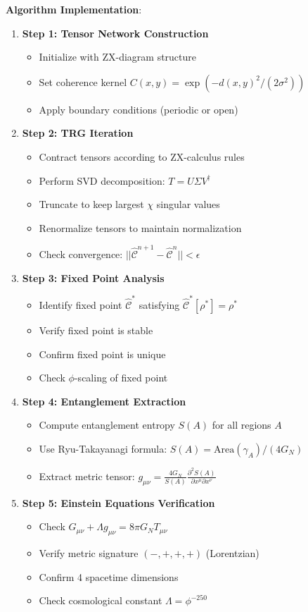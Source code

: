 \documentclass[11pt]{article}
\theoremstyle{definition}
\newcommand{\goldenratio}{\phi}
\newcommand{\coherence}{\mathcal{C}}
\newcommand{\density}{\rho}
\begin{document}
\textbf{Algorithm Implementation}:
\begin{enumerate}
\item \textbf{Step 1: Tensor Network Construction}
\begin{itemize}
\item Initialize with ZX-diagram structure
\item Set coherence kernel $C(x,y) = \exp(-d(x,y)^2/(2\sigma^2))$
\item Apply boundary conditions (periodic or open)
\end{itemize}

\item \textbf{Step 2: TRG Iteration}
\begin{itemize}
\item Contract tensors according to ZX-calculus rules
\item Perform SVD decomposition: $T = U\Sigma V^\dagger$
\item Truncate to keep largest $\chi$ singular values
\item Renormalize tensors to maintain normalization
\item Check convergence: $||\hat{\coherence}^{n+1} - \hat{\coherence}^n|| < \epsilon$
\end{itemize}

\item \textbf{Step 3: Fixed Point Analysis}
\begin{itemize}
\item Identify fixed point $\hat{\coherence}^*$ satisfying $\hat{\coherence}^*[\density^*] = \density^*$
\item Verify fixed point is stable
\item Confirm fixed point is unique
\item Check $\goldenratio$-scaling of fixed point
\end{itemize}

\item \textbf{Step 4: Entanglement Extraction}
\begin{itemize}
\item Compute entanglement entropy $S(A)$ for all regions $A$
\item Use Ryu-Takayanagi formula: $S(A) = \text{Area}(\gamma_A)/(4G_N)$
\item Extract metric tensor: $g_{\mu\nu} = \frac{4G_N}{S(A)} \frac{\partial^2 S(A)}{\partial x^\mu \partial x^\nu}$
\end{itemize}

\item \textbf{Step 5: Einstein Equations Verification}
\begin{itemize}
\item Check $G_{\mu\nu} + \Lambda g_{\mu\nu} = 8\pi G_N T_{\mu\nu}$
\item Verify metric signature $(-,+,+,+)$ (Lorentzian)
\item Confirm 4 spacetime dimensions
\item Check cosmological constant $\Lambda = \goldenratio^{-250}$
\end{itemize}
\end{enumerate}
\end{document}
